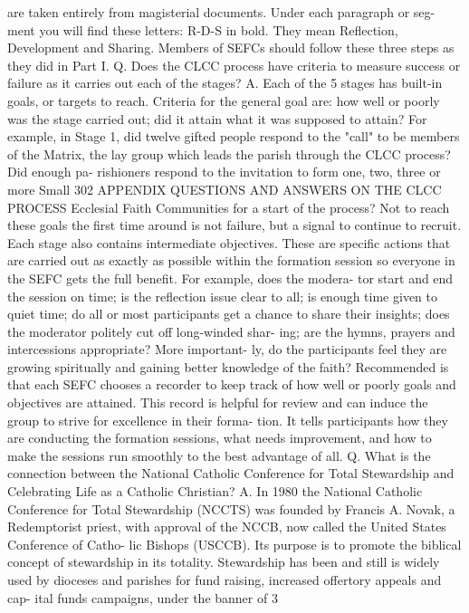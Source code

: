 \documentclass[oneside]{book}
\begin{document}
are taken entirely from magisterial documents. Under each paragraph or seg- ment
you will find these letters: R-D-S in bold. They mean Reflection, Development
and Sharing. Members of SEFCs should follow these three steps as they did in
Part I.  Q. Does the CLCC process have criteria to measure success or failure as
it carries out each of the stages?  A. Each of the 5 stages has built-in goals,
or targets to reach. Criteria for the general goal are: how well or poorly was
the stage carried out; did it attain what it was supposed to attain? For
example, in Stage 1, did twelve gifted people respond to the "call" to be
members of the Matrix, the lay group which leads the parish through the CLCC
process? Did enough pa- rishioners respond to the invitation to form one, two,
three or more Small 302 APPENDIX QUESTIONS AND ANSWERS ON THE CLCC PROCESS
Ecclesial Faith Communities for a start of the process? Not to reach these goals
the first time around is not failure, but a signal to continue to recruit. Each
stage also contains intermediate objectives. These are specific actions that are
carried out as exactly as possible within the formation session so everyone in
the SEFC gets the full benefit. For example, does the modera- tor start and end
the session on time; is the reflection issue clear to all; is enough time given
to quiet time; do all or most participants get a chance to share their insights;
does the moderator politely cut off long-winded shar- ing; are the hymns,
prayers and intercessions appropriate? More important- ly, do the participants
feel they are growing spiritually and gaining better knowledge of the faith?
Recommended is that each SEFC chooses a recorder to keep track of how well or
poorly goals and objectives are attained. This record is helpful for review and
can induce the group to strive for excellence in their forma- tion. It tells
participants how they are conducting the formation sessions, what needs
improvement, and how to make the sessions run smoothly to the best advantage of
all.  Q. What is the connection between the National Catholic Conference for
Total Stewardship and Celebrating Life as a Catholic Christian?  A. In 1980 the
National Catholic Conference for Total Stewardship (NCCTS) was founded by
Francis A. Novak, a Redemptorist priest, with approval of the NCCB, now called
the United States Conference of Catho- lic Bishops (USCCB). Its purpose is to
promote the biblical concept of stewardship in its totality. Stewardship has
been and still is widely used by dioceses and parishes for fund raising,
increased offertory appeals and cap- ital funds campaigns, under the banner of 3
\end{document}
